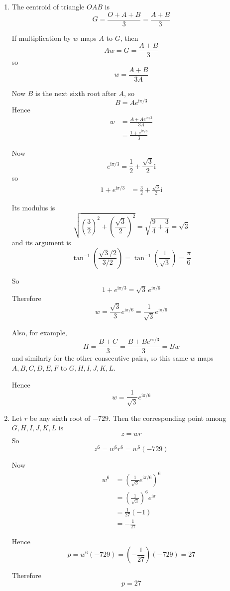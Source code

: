 \documentclass[leqno]{article}
\begin{document}
\begin{enumerate}[
  label=\textbf{\arabic*.},
  leftmargin=*,
  topsep=0pt,
  partopsep=0pt,
  parsep=0pt
]
\begin{tcolorbox}[colback=white, colframe=scarlet, title={\textbf{Solution}}, breakable, grow to left by=6mm, grow to right by=10mm]
\begin{enumerate}[label=\textbf{(\alph*)}]
  \item The centroid of triangle \(OAB\) is
\[
G=\frac{O+A+B}{3}=\frac{A+B}{3}
\]

If multiplication by \(w\) maps \(A\) to \(G\), then
\[
Aw=G=\frac{A+B}{3}
\]
so
\[
w=\frac{A+B}{3A}
\]

Now \(B\) is the next sixth root after \(A\), so
\[
B=Ae^{\mathrm{i}\pi/3}
\]
Hence
\begin{align*}
w&=\frac{A+Ae^{\mathrm{i}\pi/3}}{3A}\\
&=\frac{1+e^{\mathrm{i}\pi/3}}{3}
\end{align*}

Now
\[
e^{\mathrm{i}\pi/3}=\frac12+\frac{\sqrt3}{2}\mathrm{i}
\]
so
\begin{align*}
1+e^{\mathrm{i}\pi/3}
&=\frac32+\frac{\sqrt3}{2}\mathrm{i}
\end{align*}

Its modulus is
\[
\sqrt{\left(\frac32\right)^2+\left(\frac{\sqrt3}{2}\right)^2}
=\sqrt{\frac94+\frac34}
=\sqrt3
\]
and its argument is
\[
\tan^{-1}\left(\frac{\sqrt3/2}{3/2}\right)=\tan^{-1}\left(\frac{1}{\sqrt3}\right)=\frac{\pi}{6}
\]

So
\[
1+e^{\mathrm{i}\pi/3}=\sqrt3\,e^{\mathrm{i}\pi/6}
\]
Therefore
\[
w=\frac{\sqrt3}{3}e^{\mathrm{i}\pi/6}=\frac{1}{\sqrt3}e^{\mathrm{i}\pi/6}
\]

Also, for example,
\[
H=\frac{B+C}{3}=\frac{B+Be^{\mathrm{i}\pi/3}}{3}=Bw
\]
and similarly for the other consecutive pairs, so this same \(w\) maps \(A,B,C,D,E,F\) to \(G,H,I,J,K,L\).

Hence
\[
w=\frac{1}{\sqrt3}e^{\mathrm{i}\pi/6}
\]

  \item Let \(r\) be any sixth root of \(-729\). Then the corresponding point among \(G,H,I,J,K,L\) is
\[
z=wr
\]
So
\[
z^6=w^6r^6=w^6(-729)
\]

Now
\begin{align*}
w^6&=\left(\frac{1}{\sqrt3}e^{\mathrm{i}\pi/6}\right)^6\\
&=\left(\frac{1}{\sqrt3}\right)^6 e^{\mathrm{i}\pi}\\
&=\frac{1}{27}(-1)\\
&=-\frac{1}{27}
\end{align*}

Hence
\[
p=w^6(-729)=\left(-\frac{1}{27}\right)(-729)=27
\]

Therefore
\[
p=27
\]
\end{enumerate}
\end{tcolorbox}



\end{enumerate}
\end{document}

